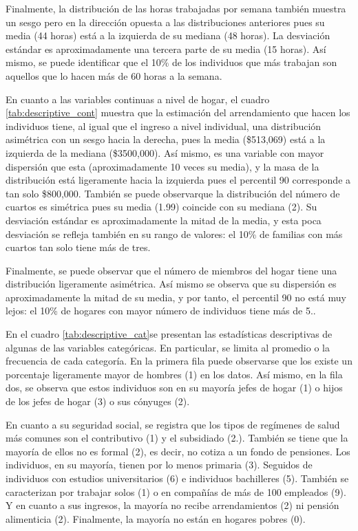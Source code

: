 \documentclass[11pt,a4paper]{article}
\begin{document}
  Finalmente, la distribución de las horas trabajadas por semana también muestra un sesgo pero en la dirección opuesta a las distribuciones anteriores pues su media (44 horas) está a la izquierda de su mediana (48 horas). La desviación estándar es aproximadamente una tercera parte de su media (15 horas). Así mismo, se puede identificar que el 10\% de los individuos que más trabajan son aquellos que lo hacen más de 60 horas a la semana.

En cuanto a las variables continuas a nivel de hogar, el cuadro \ref{tab:descriptive_cont} muestra que la estimación del arrendamiento que hacen los individuos tiene, al igual que el ingreso a nivel individual, una distribución asimétrica con un sesgo hacia la derecha, pues la media (\$513,069) está a la izquierda de la mediana (\$3500,000). Así mismo, es una variable con mayor dispersión que esta (aproximadamente 10 veces su media), y la masa de la distribución está ligeramente hacia la izquierda pues el percentil 90 corresponde a tan solo \$800,000. También se puede observarque la distribución del número de cuartos es simétrica pues su media (1.99) coincide con su mediana (2). Su desviación estándar es aproximadamente la mitad de la media, y esta poca desviación se refleja también en su rango de valores: el 10\% de familias con más cuartos tan solo tiene más de tres. 

Finalmente, se puede observar que el número de miembros del hogar tiene una distribución ligeramente asimétrica. Así mismo se observa que su dispersión es aproximadamente la mitad de su media, y por tanto, el percentil 90 no está muy lejos: el 10\% de hogares con mayor número de individuos tiene más de 5.. 

En el cuadro \ref{tab:descriptive_cat}se presentan las estadísticas descriptivas de algunas de las variables categóricas. En particular, se limita al promedio o la frecuencia de cada categoría. En la primera fila puede observarse que los existe un porcentaje ligeramente mayor de hombres (1) en los datos. Así mismo, en la fila dos, se observa que estos individuos son en su mayoría jefes de hogar (1) o hijos de los jefes de hogar (3) o sus cónyuges (2). 

En cuanto a su seguridad social, se registra que los tipos de regímenes de salud más comunes son el contributivo (1) y el subsidiado (2.). También se tiene que la mayoría de ellos no es formal (2), es decir, no cotiza a un fondo de pensiones. Los individuos, en su mayoría, tienen por lo menos primaria (3). Seguidos de individuos con estudios universitarios (6) e individuos bachilleres (5). También se caracterizan por trabajar solos (1) o en compañías de más de 100 empleados (9). Y en cuanto a sus ingresos, la mayoría no recibe arrendamientos (2) ni pensión alimenticia (2). Finalmente, la mayoría no están en hogares pobres (0).
\end{document}
